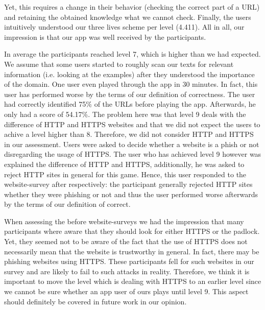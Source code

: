 \begin{description}[leftmargin=0cm]
	Yet, this requires a change in their behavior (checking the correct part of a URL) and retaining the obtained knowledge what we cannot check.
	Finally, the users intuitively understood our three lives scheme per level (4.411).
	All in all, our impression is that our app was well received by the participants.
	\item[Achieved Levels] In average the participants reached level 7, which is higher than we had expected.
	We assume that some users started to roughly scan our texts for relevant information (i.e. looking at the examples) after they understood the importance of the domain.
	One user even played through the app in 30 minutes.
	In fact, this user has performed worse by the terms of our definition of correctness.
	The user had correctly identified 75\% of the URLs before playing the app.
	Afterwards, he only had a score of 54.17\%.
	The problem here was that level 9 deals with the difference of HTTP and HTTPS websites and that we did not expect the users to achive a level higher than 8.
	Therefore, we did not consider HTTP and HTTPS in our assessment.
	Users were asked to decide whether a website is a phish or not disregarding the usage of HTTPS.
	The user who has achieved level 9 however was explained the difference of HTTP and HTTPS, additionally, he was asked to reject HTTP sites in general for this game.
	Hence, this user responded to the website-survey after respectively: the participant generally rejected HTTP sites whether they were phishing or not and thus the user performed worse afterwards by the terms of our definition of correct.
	\item[HTTPS and Padlock] When assessing the before website-surveys we had the impression that many participants where aware that they should look for either HTTPS or the padlock.
	Yet, they seemed not to be aware of the fact that the use of HTTPS does not necessarily mean that the website is trustworthy in general.
	In fact, there may be phishing websites using HTTPS.
	These participants fell for such websites in our survey and are likely to fail to such attacks in reality.
	Therefore, we think it is important to move the level which is dealing with HTTPS to an earlier level since we cannot be sure whether an app user of ours plays until level 9.
	This aspect should definitely be covered in future work in our opinion.
	

\end{description}






